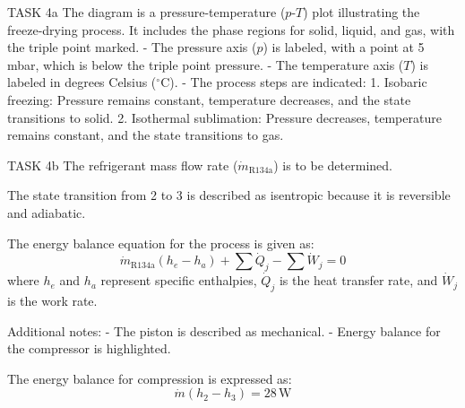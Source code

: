 TASK 4a  
The diagram is a pressure-temperature (\(p\)-\(T\)) plot illustrating the freeze-drying process. It includes the phase regions for solid, liquid, and gas, with the triple point marked.  
- The pressure axis (\(p\)) is labeled, with a point at 5 mbar, which is below the triple point pressure.  
- The temperature axis (\(T\)) is labeled in degrees Celsius (\(^\circ\text{C}\)).  
- The process steps are indicated:  
  1. Isobaric freezing: Pressure remains constant, temperature decreases, and the state transitions to solid.  
  2. Isothermal sublimation: Pressure decreases, temperature remains constant, and the state transitions to gas.  

TASK 4b  
The refrigerant mass flow rate (\(\dot{m}_{\text{R134a}}\)) is to be determined.  

The state transition from 2 to 3 is described as isentropic because it is reversible and adiabatic.  

The energy balance equation for the process is given as:  
\[
\dot{m}_{\text{R134a}} (h_e - h_a) + \sum \dot{Q}_j - \sum \dot{W}_j = 0
\]  
where \(h_e\) and \(h_a\) represent specific enthalpies, \(\dot{Q}_j\) is the heat transfer rate, and \(\dot{W}_j\) is the work rate.  

Additional notes:  
- The piston is described as mechanical.  
- Energy balance for the compressor is highlighted.  

The energy balance for compression is expressed as:  
\[
\dot{m} (h_2 - h_3) = 28 \, \text{W}
\]
